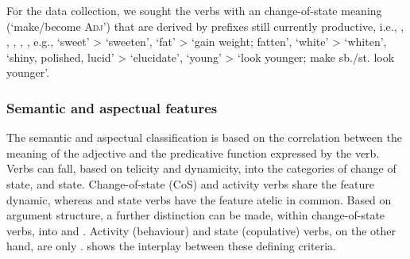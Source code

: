 \documentclass[output=paper,colorlinks,citecolor=brown]{langscibook}
\begin{document}
For the data collection, we sought the verbs with an  change-of-state  meaning (‘make/become \textsc{Adj}’) that are derived by prefixes still currently productive, i.e., , , , , , e.g.,  ‘sweet’ >  ‘sweeten’,  ‘fat’ >  ‘gain weight; fatten’,  ‘white’ >  ‘whiten’,  ‘shiny, polished, lucid’ >  ‘elucidate’,  ‘young’ >  ‘look younger; make sb./st. look younger’.


\subsubsection{Semantic and aspectual features} 

The semantic and aspectual classification is based on the correlation between the meaning of the adjective and the predicative function expressed by the verb. Verbs can fall, based on telicity and dynamicity, into the categories of change of state,  and state. Change-of-state (CoS) and activity verbs share the feature dynamic, whereas  and state verbs have the feature atelic in common. Based on argument structure, a further distinction can be made, within change-of-state verbs, into  and . Activity (behaviour) and state (copulative) verbs, on the other hand, are only .  shows the interplay between these defining criteria.
\end{document}
